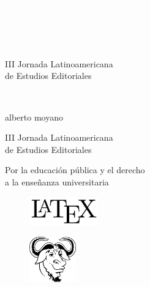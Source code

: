 \newpage
\thispagestyle{empty}
{\textcolor{white}{.}}

\newpage
\thispagestyle{empty}
{\textcolor{white}{.}}

\newpage
\thispagestyle{empty}
{\textcolor{white}{.}}

\vspace{30mm}

\begin{center}
	\LARGE{III Jornada Latinoamericana\\ de Estudios Editoriales}
\end{center}

\newpage
\thispagestyle{empty}
{\textcolor{white}{.}}

\newpage
\thispagestyle{empty}
\begin{center}%
{\sc\large{alberto moyano}}\\ %
\end{center}

\vspace{30mm}

\begin{center}
\LARGE{III Jornada Latinoamericana\\ de Estudios Editoriales}\\\vspace{10mm}

\Large{Por la educación pública y el derecho\\ a la enseñanza universitaria}
\end{center}

\vfill

\begin{figure}[b]
\centering
\includegraphics[width=30mm]{./media/logo-LaTeX.png}
\end{figure}

\newpage
\thispagestyle{empty}
\begin{figure}[t]
\centering
\vspace{-10mm}
\includegraphics[width=20mm]{./media/logo-GNU.png}\\
\end{figure}

